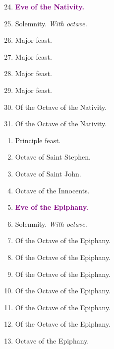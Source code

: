 		\begin{enumerate}
			\setcounter{enumi}{23}
			\item \textcolor{purple}{\textbf{Eve of the Nativity.}}
			\item \textbf{} Solemnity. \textit{With octave.}
			\item {} Major feast.
			\item {} Major feast.
			\item {} Major feast.
			\item {} Major feast.
			\item Of the Octave of the Nativity. %
			\item Of the Octave of the Nativity.
		\end{enumerate}
		\begin{enumerate}
			\item {} Principle feast.
			\item Octave of Saint Stephen.
			\item Octave of Saint John.
			\item Octave of the Innocents.
			\item \textcolor{purple}{\textbf{Eve of the Epiphany.}}
			\item {} Solemnity. \textit{With octave.}
			\item Of the Octave of the Epiphany.
			\item Of the Octave of the Epiphany.
			\item Of the Octave of the Epiphany.
			\item Of the Octave of the Epiphany.
			\item Of the Octave of the Epiphany.
			\item Of the Octave of the Epiphany.
			\item Octave of the Epiphany.
		\end{enumerate}